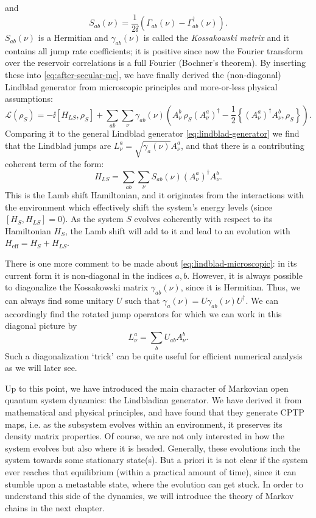 and
\begin{equation}
       S_{ab}(\nu) = \frac{1}{2\ii}\left(\Gamma_{ab}(\nu) - \Gamma_{ab}^\dagger(\nu)\right).
\end{equation}
$S_{ab}(\nu)$ is a Hermitian and $\gamma_{ab}(\nu)$ is called the \textit{Kossakowski matrix} and it contains all jump rate coefficients; it is positive since now the Fourier transform over the reservoir correlations is a full Fourier (Bochner's theorem).
By inserting these into \eqref{eq:after-secular-me}, we have finally derived the (non-diagonal) Lindblad generator from microscopic principles and more-or-less physical assumptions:
\begin{equation}
    \label{eq:lindblad-microscopic}
    \mathcal{L}(\rho_S) = -\ii[H_{LS}, \rho_S] +  \sum_{ab}\sum_\nu \gamma_{ab}(\nu)\left(A^b_\nu\, \rho_S (A^a_\nu)^\dagger - \frac{1}{2}\left\{(A^a_\nu)^\dagger A^b_\nu, \rho_S\right\}\right).
\end{equation}
Comparing it to the general Lindblad generator \eqref{eq:lindblad-generator} we find that the Lindblad jumps are $L^a_\nu = \sqrt{\gamma_a(\nu)} A^a_\nu$, and that there is a contributing coherent term of the form:
\begin{equation}
    H_{LS} = \sum_{ab}\sum_\nu S_{ab}(\nu)(A_\nu^a)^\dagger A_\nu^b.
\end{equation}
This is the Lamb shift Hamiltonian, and it originates from the interactions with the environment which effectively shift the system's energy levels (since $[H_S, H_{LS}] = 0$). As the system $S$ evolves coherently with respect to its Hamiltonian $H_S$, the Lamb shift will add to it and lead to an evolution with $H_\text{eff} = H_S + H_{LS}$. 

There is one more comment to be made about \eqref{eq:lindblad-microscopic}: in its current form it is non-diagonal in the indices $a, b$. However, it is always possible to diagonalize the Kossakowski matrix $\gamma_{ab}(\nu)$, since it is Hermitian. Thus, we can always find some unitary $U$ such that $\gamma_a(\nu) = U \gamma_{ab}(\nu) U^\dagger$. We can accordingly find the rotated jump operators for which we can work in this diagonal picture by
\begin{equation}
    \label{eq:diagonalize-jumps-in-generator}
    L^a_\nu = \sum_b U_{ab} A^b_\nu.
\end{equation} 
Such a diagonalization `trick' can be quite useful for efficient numerical analysis as we will later see. 

Up to this point, we have introduced the main character of Markovian open quantum system dynamics: the Lindbladian generator. We have derived it from mathematical and physical principles, and have found that they generate CPTP maps, i.e. as the subsystem evolves within an environment, it preserves its density matrix properties. Of course, we are not only interested in how the system evolves but also where it is headed. Generally, these evolutions inch the system towards some stationary state(s). But a priori it is not clear if the system ever reaches that equilibrium (within a practical amount of time), since it can stumble upon a metastable state, where the evolution can get stuck. In order to understand this side of the dynamics, we will introduce the theory of Markov chains in the next chapter.
